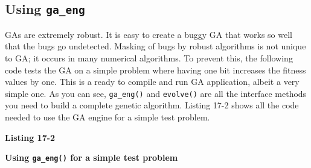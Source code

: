 
\subsection*{Using \texttt{ga\_eng}}

GAs are extremely robust. It is easy to create a buggy GA that
works so well that the bugs go undetected. Masking of
bugs by robust algorithms is not unique to GA; it occurs in many
numerical algorithms. To prevent this, the following code tests
the GA on a simple problem where having one bit increases the fitness
values by one. This is a ready to compile and run GA application,
albeit a very simple one. As you can see, \texttt{ga\_eng()} and
\texttt{evolve()} are all the interface methods you need to build a
complete genetic algorithm. Listing 17-2 shows all the code needed
to use the GA engine for a simple test problem.

\bigskip

{\sffamily\bfseries Listing 17-2}

{\sffamily\bfseries Using \texttt{ga\_eng()} for a simple test problem}

